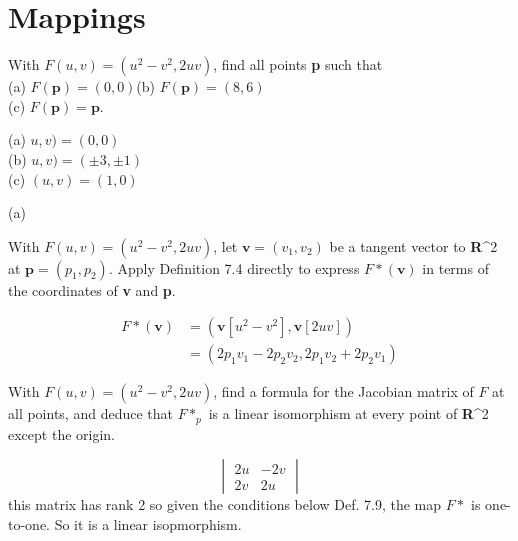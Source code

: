 \section{Mappings}
\begin{problem}{1}
  With \(F(u,v)=(u^2-v^2,2uv)\), find all points \textbf{p} such that\\
  (a) \(F(\mathbf{p})=(0,0)\)\quad(b) \(F(\mathbf{p})=(8,6)\)\\
  (c) \(F(\mathbf{p})=\mathbf{p}\).
\end{problem}
\begin{sol}
  (a) \(u,v)=(0,0)\)\\
  (b) \(u,v)=(\pm 3,\pm 1)\)\\
  (c) \((u,v)=(1,0)\)
\end{sol}

\begin{problem}{2}
  (a)
\end{problem}

\begin{problem}{3}
  With \(F(u,v)=(u^2-v^2,2uv)\), let \(\mathbf{v} = (v_1, v_2)\) be a tangent vector to \textbf{R}^2 at \(\mathbf{p} = (p_1, p_2)\). Apply Definition 7.4 directly to express \(F*(\mathbf{v})\) in terms of the coordinates of \textbf{v} and \textbf{p}.
\end{problem}
\begin{sol}
  \begin{align}
    F*(\mathbf{v})&=(\mathbf{v}[u^2-v^2],\mathbf{v}[2uv])\\
    &=(2p_1v_1-2p_2v_2,2p_1v_2+2p_2v_1)
  \end{align}
\end{sol}

\begin{problem}{4}
  With \(F(u,v)=(u^2-v^2,2uv)\), find a formula for the Jacobian matrix of \(F\) at all points, and deduce that \(F*_p\) is a linear isomorphism at every point of \textbf{R}^2 except the origin.
\end{problem}
\begin{sol}
  \begin{equation}
    \begin{vmatrix}
      2u&-2v\\
      2v&2u
    \end{vmatrix}
  \end{equation}
  this matrix has rank 2 so given the conditions below Def. 7.9, the map \(F*\) is one-to-one. So it is a linear isopmorphism.
\end{sol}

